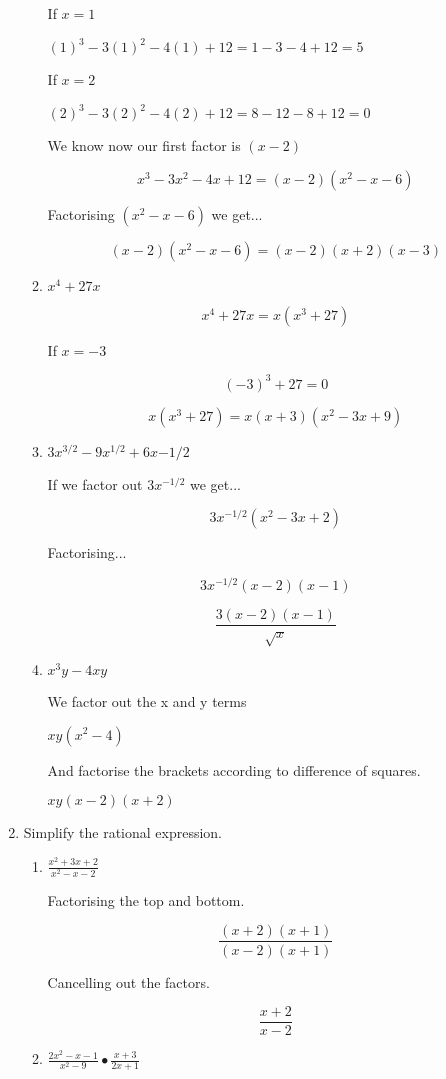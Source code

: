\documentclass{article}
\begin{document}
\begin{enumerate}
\begin{enumerate}
		If $x = 1$
		
		$(1)^3 - 3(1)^2 - 4(1) + 12 = 1 - 3 - 4 + 12 = 5$
		
		If $x = 2$
		
		$(2)^3 - 3(2)^2 - 4(2) + 12 = 8 - 12 - 8 + 12 = 0$
		
		We know now our first factor is $(x - 2)$
		
		$$x^3 - 3x^2 - 4x + 12 = (x - 2)(x^2 - x - 6)$$
		
		Factorising $(x^2 - x - 6)$ we get...
		
		$$(x - 2)(x^2 - x - 6) = (x-2)(x+2)(x-3)$$
		
		\item $x^4 + 27x$
		
			$$x^4 + 27x = x(x^3 + 27)$$
		
			If $x = -3$
		
			$$(-3)^3 + 27 = 0$$
		
			$$x(x^3 + 27) = x(x + 3)(x^2 - 3x + 9)$$
		
		\item $3x^{3/2} - 9x^{1/2} + 6x{-1/2}$
		
			If we factor out $3x^{-1/2}$ we get...
			
			$$3x^{-1/2}(x^2 - 3x + 2)$$
			
			Factorising...
			
			$$3x^{-1/2}(x - 2)(x - 1)$$
			
			$$\frac{3(x-2)(x-1)}{\sqrt{x}}$$
			
		\item $x^3y - 4xy$
		
			We factor out the x and y terms
			
			$xy(x^2 - 4)$
			
			And factorise the brackets according to difference of squares.
			
			$xy(x - 2)(x + 2)$
		
	\end{enumerate}
	\item Simplify the rational expression.
	\begin{enumerate}
		\item $\frac{x^2 + 3x + 2}{x^2 - x - 2}$
		
			Factorising the top and bottom.
			
			$$\frac{(x + 2)(x + 1)}{(x-2)(x+1)}$$
			
			Cancelling out the factors.
			
			$$\frac{x+2}{x-2}$$
			
		\item $\frac{2x^2 - x - 1}{x^2 - 9} \bullet \frac{x+3}{2x + 1}$
		

\end{enumerate}
\end{enumerate}
\end{document}
